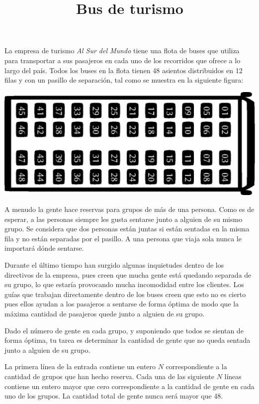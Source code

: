 \documentclass{oci}
\title{Bus de turismo}
\begin{document}
\begin{problemDescription}
  La empresa de turismo \emph{Al Sur del Mundo} tiene una flota de buses que
  utiliza para transportar a sus pasajeros en cada uno de los recorridos que
  ofrece a lo largo del país. 
  Todos los buses en la flota tienen 48 asientos distribuidos en 12 filas y con
  un pasillo de separación, tal como se muestra en la siguiente figura:
  \begin{center}
  \includegraphics[scale=0.8]{bus.eps}
  \end{center}
  A menudo la gente hace reservas para grupos de más de una persona.
  Como es de esperar, a las personas siempre les gusta sentarse junto a alguien
  de su mismo grupo.
  Se considera que dos personas están juntas si están sentadas en la misma fila
  y no están separadas por el pasillo.
  A una persona que viaja sola nunca le importará dónde sentarse.

  Durante el último tiempo han surgido algunas inquietudes dentro de los
  directivos de la empresa, pues creen que mucha gente está quedando separada de
  su grupo, lo que estaría provocando mucha incomodidad entre los clientes.
  Los guías que trabajan directamente dentro de los buses creen que esto no es
  cierto pues ellos ayudan a los pasajeros a sentarse de forma óptima de modo
  que la máxima cantidad de pasajeros quede junto a alguien de su grupo.

  Dado el número de gente en cada grupo, y suponiendo que todos se sientan de
  forma óptima, tu tarea es determinar la cantidad de gente que no queda sentada
  junto a alguien de su grupo.
  
\end{problemDescription}

\begin{inputDescription}
  La primera línea de la entrada contiene un entero $N$ correspondiente a la
  cantidad de grupos que han hecho reserva.
  Cada una de las siguiente $N$ líneas contiene un entero mayor que cero
  correspondiente a la cantidad de gente en cada uno de los grupos.
  La cantidad total de gente nunca será mayor que 48.
\end{inputDescription}
\end{document}
